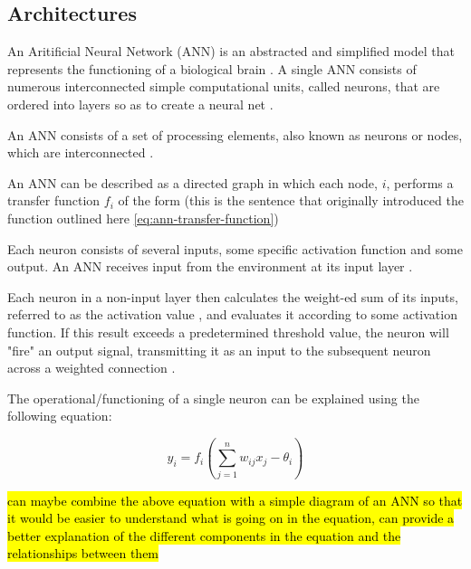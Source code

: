 \subsection{Architectures}

An Aritificial Neural Network (ANN) is an abstracted and simplified model that represents the functioning of a biological brain \cite{mcculloch1943logical}. A single ANN consists of numerous interconnected simple computational units, called neurons, that are ordered into layers so as to create a neural net \cite{RefWorks:31}.

An ANN consists of a set of processing elements, also known as neurons or nodes, which are interconnected \cite{XinYao1999}.

An ANN can be described as a directed graph in which each node, $i$, performs a transfer function $f_i$ of the form \cite{XinYao1999} (this is the sentence that originally introduced the function outlined here \ref{eq:ann-transfer-function})


Each neuron consists of several inputs, some specific activation function and some output. An ANN receives input from the environment at its input layer \cite{RefWorks:32}.

Each neuron in a non-input layer then calculates the weight-ed sum of its inputs, referred to as the activation value \cite{yegnanarayana2009artificial,RefWorks:31}, and evaluates it according to some activation function. If this result exceeds a predetermined threshold value, the neuron will "fire" an output signal, transmitting it as an input to the subsequent neuron across a weighted connection \cite{yegnanarayana2009artificial}.


The operational/functioning of a single neuron can be explained using the following equation:

\begin{equation} \label{eq:ann-transfer-function}
	y_i = f_i(\sum_{j=1}^{n} w_{ij} x_j - \theta_i)
\end{equation}

\hl{can maybe combine the above equation with a simple diagram of an ANN so that it would be easier to understand what is going on in the equation, can provide a better explanation of the different components in the equation and the relationships between them}

